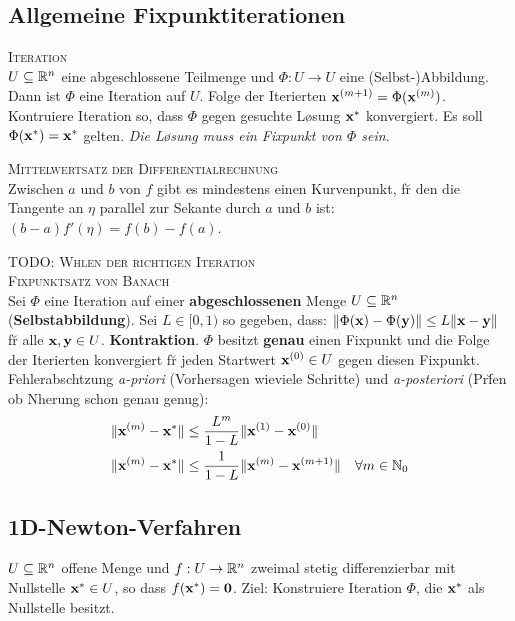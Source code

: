 \subsection{Allgemeine Fixpunktiterationen}
\textsc{Iteration}\\
$U \subseteq \mathbb{R}^{n}$ eine abgeschlossene Teilmenge und $\Phi: U \rightarrow U$ eine (Selbst-)Abbildung. Dann ist $\Phi$ eine Iteration auf $U$. Folge der Iterierten $\mbox{\bf x}^{(m+1)} = \Phi(\mbox{\bf x}^{(m)})$. Kontruiere Iteration so, dass $\Phi$ gegen gesuchte L\o sung $\mbox{\bf x}^*$ konvergiert. Es soll $\Phi(\mbox{\bf x}^*) = \mbox{\bf x}^*$ gelten. \emph{Die L\o sung muss ein Fixpunkt von $\Phi$ sein.}\vspace{0.2cm}

\textsc{Mittelwertsatz der Differentialrechnung}\\
Zwischen $a$ und $b$ von $f$ gibt es mindestens einen Kurvenpunkt, f\u r den die Tangente an $\eta$ parallel zur Sekante durch $a$ und $b$ ist:
$(b-a)f'(\eta) = f(b)-f(a)$. \vspace{0.2cm}

\textsc{TODO: W\a hlen der richtigen Iteration}\\

\textsc{Fixpunktsatz von Banach}\\
Sei $\Phi$ eine Iteration auf einer \textbf{abgeschlossenen} Menge $U \subseteq \mathbb{R}^{n}$ (\textbf{Selbstabbildung}). Sei $L \in [0,1)$ so gegeben, dass: $\Vert \Phi(\mbox{\bf x}) - \Phi(\mbox{\bf y}) \Vert \leq L \Vert \mbox{\bf x} - \mbox{\bf y} \Vert$ f\u r alle $\mbox{\bf x},\mbox{\bf y} \in U$. \textbf{Kontraktion}. $\Phi$ besitzt \textbf{genau} einen Fixpunkt und die Folge der Iterierten konvergiert f\u r jeden Startwert $\mbox{\bf x}^{(0)} \in U$ gegen diesen Fixpunkt.\\
Fehlerabsch\a tzung \emph{a-priori} (Vorhersagen wieviele Schritte) und \emph{a-posteriori} (Pr\u fen ob N\a herung schon genau genug):
\begin{align*}
\Vert \mbox{\bf x}^{(m)} - \mbox{\bf x}^* \Vert &\leq \frac{L^m}{1-L} \Vert \mbox{\bf x}^{(1)} - \mbox{\bf x}^{(0)} \Vert \\
\Vert \mbox{\bf x}^{(m)} - \mbox{\bf x}^* \Vert &\leq \frac{1}{1-L} \Vert \mbox{\bf x}^{(m)} - \mbox{\bf x}^{(m+1)} \Vert \quad \forall m \in \mathbb{N}_0
\end{align*}

\subsection{1D-Newton-Verfahren}
$U \subseteq \mathbb{R}^{n}$ offene Menge und $f: U \rightarrow \mathbb{R}^{n}$ zweimal stetig differenzierbar mit Nullstelle $\mbox{\bf x}^*\in U$, so dass $f(\mbox{\bf x}^*)=\mbox{\bf 0}$. Ziel: Konstruiere Iteration $\Phi$, die $\mbox{\bf x}^*$ als Nullstelle besitzt.\vspace{0.2cm}

